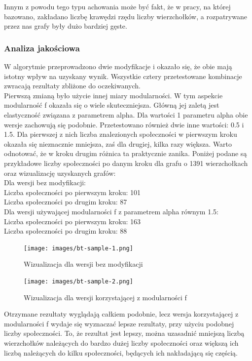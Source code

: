 \documentclass{article}
\begin{document}
Innym z powodu tego typu achowania może być fakt, że w pracy, na której bazowano, zakładano liczbę krawędzi rzędu liczby wierzchołków, a rozpatrywane przez nas grafy były dużo bardziej gęste.\\

\subsubsection{Analiza jakościowa}
W algorytmie przeprowadzono dwie modyfikacje i okazało się, że obie mają istotny wpływ na uzyskany wynik. Wszystkie cztery przetestowane kombinacje zwracają rezultaty zbliżone do oczekiwanych.\\ 

Pierwszą zmianą było użycie innej miary modularności. W tym aspekcie modularność f okazała się o wiele skuteczniejsza. Główną jej zaletą jest elastyczność związana z parametrem alpha. Dla wartości 1 parametru alpha obie wersje zachowują się podobnie. Przetestowano również dwie inne wartości: 0.5 i 1.5. Dla pierwszej z nich liczba znalezionych społeczności w pierwszym kroku okazała się nieznacznie mniejsza, zaś dla drugiej, kilka razy większa. Warto odnotować, że w kroku drugim różnica ta praktycznie zanika. Poniżej podane są przykładowe liczby społeczności po danym kroku dla grafu o 1391 wierzchołkach oraz wizualizację uzyskanych grafów:\\
Dla wersji bez modyfikacji:\\
Liczba społeczności po pierwszym kroku: 101\\
Liczba społeczności po drugim kroku: 87\\
Dla wersji używającej modularności f z parametrem alpha równym 1.5:\\
Liczba społeczności po pierwszym kroku: 163\\
Liczba społeczności po drugim kroku: 88\\

\begin{figure}[H]
\centering
\texttt{[image: images/bt-sample-1.png]}
\caption{Wizualizacja dla wersji bez modyfikacji}
\end{figure}

\begin{figure}[H]
\centering
\texttt{[image: images/bt-sample-2.png]}
\caption{Wizualizacja dla wersji korzystającej z modularności f}
\end{figure}

Otrzymane rezultaty wyglądają całkiem podobnie, lecz wersja korzystającej z modularności f wydaje się wyznaczać lepsze rezultaty, przy użyciu podobnej liczby społeczności. To, że rezultat jest lepszy, można uzasadnić mniejszą liczbą wierzchołków należących do bardzo dużej liczby społeczności oraz większą ich liczbą należących do kilku społeczności, będących ich nakładającą się częścią.\\
\end{document}
